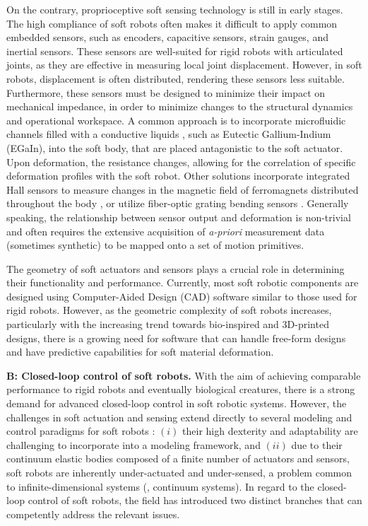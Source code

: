On the contrary, proprioceptive soft sensing technology is still in early stages. The high compliance of soft robots often makes it difficult to apply common embedded sensors, such as encoders, capacitive sensors, strain gauges, and inertial sensors. These sensors are well-suited for rigid robots with articulated joints, as they are effective in measuring local joint displacement. However, in soft robots, displacement is often distributed, rendering these sensors less suitable. Furthermore, these sensors must be designed to minimize their impact on mechanical impedance, in order to minimize changes to the structural dynamics and operational workspace. A common approach is to incorporate microfluidic channels filled with a conductive liquids \cite{Tapia2020,Teng2018,Park2012}, such as Eutectic Gallium-Indium (EGaIn), into the soft body, that are placed antagonistic to the soft actuator. Upon deformation, the resistance changes, allowing for the correlation of specific deformation profiles with the soft robot. Other solutions incorporate integrated Hall sensors to measure changes in the magnetic field of ferromagnets distributed throughout the body \cite{Baaij2023,Skorina2017Jan}, or utilize fiber-optic grating bending sensors \cite{Galloway2019}. Generally speaking, the relationship between sensor output and deformation is non-trivial and often requires the extensive acquisition of \textit{a-priori} measurement data (sometimes synthetic) to be mapped onto a set of motion primitives.

The geometry of soft actuators and sensors plays a crucial role in determining their functionality and performance. Currently, most soft robotic components are designed using Computer-Aided Design (CAD) software similar to those used for rigid robots. However, as the geometric complexity of soft robots increases, particularly with the increasing trend towards bio-inspired and 3D-printed designs, there is a growing need for software that can handle free-form designs and have predictive capabilities for soft material deformation.

\textbf{B: Closed-loop control of soft robots.} With the aim of achieving comparable performance to rigid robots and eventually biological creatures, there is a strong demand for advanced closed-loop control in soft robotic systems. However, the challenges in soft actuation and sensing extend directly to several modeling and control paradigms for soft robots \cite{Armanini2023,DellaSantina2021}: $(i)$ their high dexterity and adaptability are challenging to incorporate into a modeling framework, and $(ii)$ due to their continuum elastic bodies composed of a finite number of actuators and sensors, soft robots are inherently under-actuated and under-sensed, a problem common to infinite-dimensional systems (\eg, continuum systems). In regard to the closed-loop control of soft robots, the field has introduced two distinct branches that can competently address the relevant issues.

